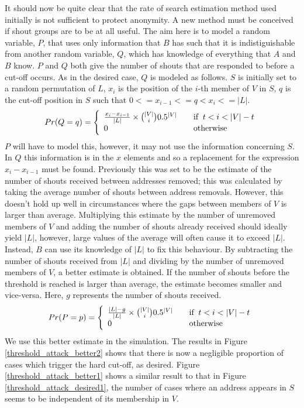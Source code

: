 \documentclass[ %
                    author={Luke Murray},
                supervisor={Dr. Simon Hollis},
                     title={Shadow Peer-to-Peer Networks},
                  subtitle={},
                    degree={MEng},
                      year={2013} ]{thesis}
\begin{document}
It should now be quite clear that the rate of search estimation method used initially is not sufficient to protect anonymity. A new method must be conceived if shout groups are to be at all useful. The aim here is to model a random variable, $P$, that uses only information that $B$ has such that it is indistiguishable from another random variable, $Q$, which has knowledge of everything that $A$ and $B$ know. $P$ and $Q$ both give the number of shouts that are responded to before a cut-off occurs. As in the desired case, $Q$ is modeled as follows. $S$ is initially set to a random permutation of $L$, $x_i$ is the position of the $i$-th member of $V$ in $S$, $q$ is the cut-off position in $S$ such that $0 <= x_{i-1} <= q < x_i <= |L|$.
\[Pr(Q = q) = \left\{
    \begin{array}{l l}
        \frac{x_i - x_{i-1}}{|L|} \times {|V| \choose i}0.5^{|V|} & \quad \text{if}\;\;t < i < |V| - t\\
        0 & \quad \text{otherwise}
    \end{array}
\right.\]
$P$ will have to model this, however, it may not use the information concerning $S$. In $Q$ this information is in the $x$ elements and so a replacement for the expression ${x_i - x_{i-1}}$ must be found. Previously this was set to be the estimate of the number of shouts received between addresses removed; this was calculated by taking the average number of shouts between address removals. However, this doesn't hold up well in circumstances where the gaps between members of $V$ is larger than average. Multiplying this estimate by the number of unremoved members of $V$ and adding the number of shouts already received should ideally yield $|L|$, however, large values of the average will often cause it to exceed $|L|$. Instead, $B$ can use its knowledge of $|L|$ to fix this behaviour. By subtracting the number of shouts received from $|L|$ and dividing by the number of unremoved members of $V$, a better estimate is obtained. If the number of shouts before the threshold is reached is larger than average, the estimate becomes smaller and vice-versa. Here, $g$ represents the number of shouts received.
\[Pr(P = p) = \left\{
    \begin{array}{l l}
        \frac{|L| - g}{|L|} \times {|V| \choose i}0.5^{|V|} & \quad \text{if}\;\;t < i < |V| - t\\
        0 & \quad \text{otherwise}
    \end{array}
\right.\]
We use this better estimate in the simulation. The results in Figure \ref{threshold_attack_better2} shows that there is now a negligible proportion of cases which trigger the hard cut-off, as desired. Figure \ref{threshold_attack_better1} shows a similar result to that in Figure \ref{threshold_attack_desired1}, the number of cases where an address appears in $S$ seems to be independent of its membership in $V$.
\end{document}
